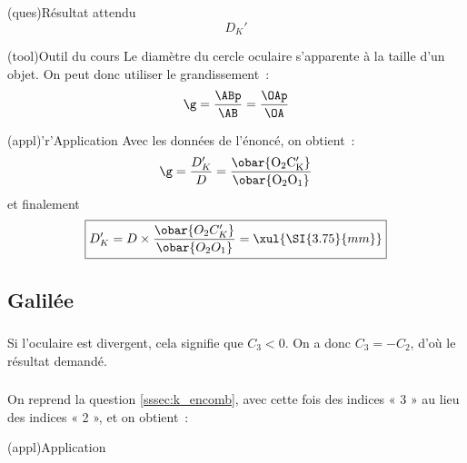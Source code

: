 \documentclass[../../main/main.tex]{subfiles}
\begin{document}
{	\subsubsection{}\label{sssec:k_diam}
	\begin{tcbraster}[raster columns=6, raster equal height=rows]
		\begin{tcolorbox}[blankest, raster multicolumn=3]
			\begin{tcbraster}[raster columns=1]
				\begin{tcb}[raster multicolumn=1](ques){Résultat attendu}
					\[D_K'\]
				\end{tcb}
				\begin{tcb}[raster multicolumn=2](tool){Outil du cours}
					Le diamètre du cercle oculaire s'apparente à la taille d'un
					objet. On peut donc utiliser le grandissement~:
					\[
						\g =
						\frac{\ABp}{\AB} =
						\frac{\OAp}{\OA}
					\]
				\end{tcb}
			\end{tcbraster}
		\end{tcolorbox}
		\begin{tcb}[raster multicolumn=3](appl)'r'{Application}
			Avec les données de l'énoncé, on obtient~:
			\[
				\g =
				\frac{D_K'}{D} =
				\frac{\obar{\rm O_2C_K'}}{\obar{\rm O_2O_1}}
			\]
			et finalement
			\[
				\boxed{D_K' = D\times \frac{\obar{O_2C_K'}}{\obar{O_2O_1}} =
					\xul{\SI{3.75}{mm}}
				}
			\]
		\end{tcb}
	\end{tcbraster}

	\subsection{Galilée}

	\subsubsection{}
	Si l'oculaire est divergent, cela signifie que $C_3 < 0$. On a donc $C_3 = -
		C_2$, d'où le résultat demandé.

	\subsubsection{}
	On reprend la question \ref{sssec:k_encomb}, avec cette fois des indices « 3 »
	au lieu des indices « 2 », et on obtient~:

	\begin{tcbraster}[raster columns=2, raster equal height=rows]
		\begin{tcb}(appl){Application}


\end{tcb}
\end{tcbraster}}
\end{document}

